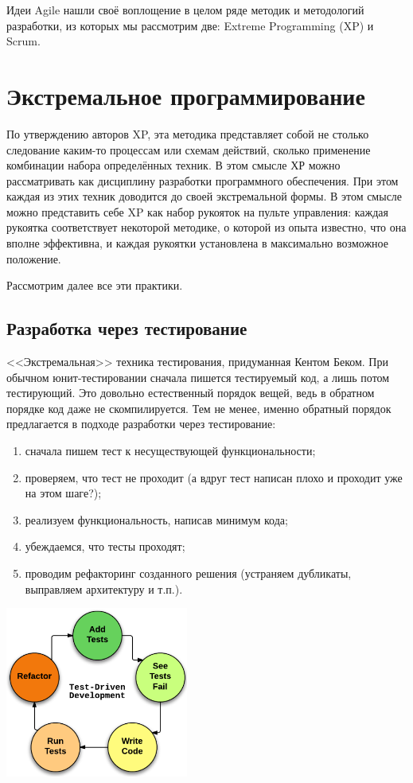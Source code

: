 \documentclass{../../text-style}
\begin{document}
Идеи Agile нашли своё воплощение в целом ряде методик и методологий разработки, из которых мы рассмотрим две: Extreme Programming (XP) и Scrum.

\section{Экстремальное программирование}

По утверждению авторов XP, эта методика представляет собой не столько следование каким-то процессам или схемам действий, сколько применение комбинации набора определённых техник. В этом смысле ХР можно рассматривать как дисциплину разработки программного обеспечения. При этом каждая из этих техник доводится до своей экстремальной формы. В этом смысле можно представить себе XP как набор рукояток на пульте управления: каждая рукоятка соответствует некоторой методике, о которой из опыта известно, что она вполне эффективна, и каждая рукоятки установлена в максимально возможное положение.

Рассмотрим далее все эти практики.

\subsection{Разработка через тестирование}

<<Экстремальная>> техника тестирования, придуманная Кентом Беком. При обычном юнит-тестировании сначала пишется тестируемый код, а лишь потом тестирующий. Это довольно естественный порядок вещей, ведь в обратном порядке код даже не скомпилируется. Тем не менее, именно обратный порядок предлагается в подходе разработки через тестирование: 

\begin{enumerate}
    \item сначала пишем тест к несуществующей функциональности;
    \item проверяем, что тест не проходит (а вдруг тест написан плохо и проходит уже на этом шаге?);
    \item реализуем функциональность, написав минимум кода;
    \item убеждаемся, что тесты проходят;
    \item проводим рефакторинг созданного решения (устраняем дубликаты, выправляем архитектуру и т.п.).
\end{enumerate}

\begin{center}
    \includegraphics[width=0.45\textwidth]{tddLoop.png}
\end{center}
\end{document}
